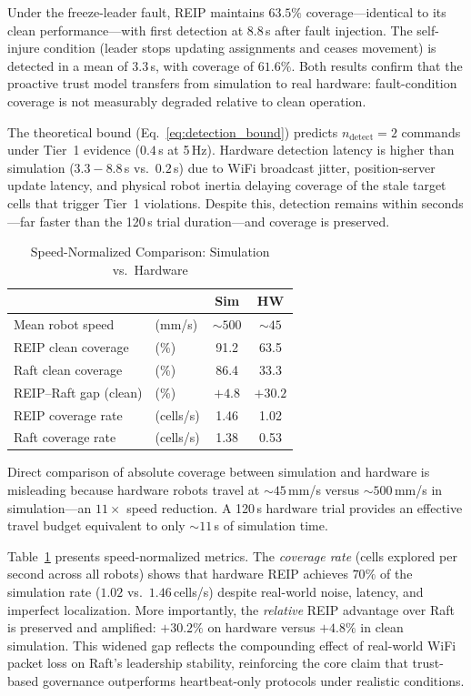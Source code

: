 \documentclass[conference]{IEEEtran}
\begin{document}
Under the freeze-leader fault, REIP maintains $63.5\%$ coverage---identical to its clean performance---with first detection at $8.8\,$s after fault injection. The self-injure condition (leader stops updating assignments and ceases movement) is detected in a mean of $3.3\,$s, with coverage of $61.6\%$. Both results confirm that the proactive trust model transfers from simulation to real hardware: fault-condition coverage is not measurably degraded relative to clean operation.

The theoretical bound (Eq.~\ref{eq:detection_bound}) predicts $n_{\text{detect}} = 2$ commands under Tier~1 evidence ($0.4\,$s at 5\,Hz). Hardware detection latency is higher than simulation ($3.3{-}8.8\,$s vs.\ $0.2\,$s) due to WiFi broadcast jitter, position-server update latency, and physical robot inertia delaying coverage of the stale target cells that trigger Tier~1 violations. Despite this, detection remains within seconds---far faster than the 120\,s trial duration---and coverage is preserved.

\begin{table}[t]
\centering
\caption{Speed-Normalized Comparison: Simulation vs.\ Hardware}
\label{tab:hw_norm}
\begin{tabular}{@{}llcc@{}}
\toprule
 & & \textbf{Sim} & \textbf{HW} \\
\midrule
Mean robot speed       & (mm/s) & ${\sim}500$ & ${\sim}45$ \\
REIP clean coverage    & (\%)   & 91.2  & 63.5 \\
Raft clean coverage    & (\%)   & 86.4  & 33.3 \\
REIP--Raft gap (clean) & (\%)   & $+4.8$ & $+30.2$ \\
REIP coverage rate     & (cells/s) & 1.46  & 1.02 \\
Raft coverage rate     & (cells/s) & 1.38  & 0.53 \\
\bottomrule
\end{tabular}
\end{table}

Direct comparison of absolute coverage between simulation and hardware is misleading because hardware robots travel at ${\sim}45\,$mm/s versus ${\sim}500\,$mm/s in simulation---an $11\times$ speed reduction. A 120\,s hardware trial provides an effective travel budget equivalent to only ${\sim}11\,$s of simulation time.

Table~\ref{tab:hw_norm} presents speed-normalized metrics. The \emph{coverage rate} (cells explored per second across all robots) shows that hardware REIP achieves $70\%$ of the simulation rate ($1.02$ vs.\ $1.46\,$cells/s) despite real-world noise, latency, and imperfect localization. More importantly, the \emph{relative} REIP advantage over Raft is preserved and amplified: $+30.2\%$ on hardware versus $+4.8\%$ in clean simulation. This widened gap reflects the compounding effect of real-world WiFi packet loss on Raft's leadership stability, reinforcing the core claim that trust-based governance outperforms heartbeat-only protocols under realistic conditions.
\end{document}

